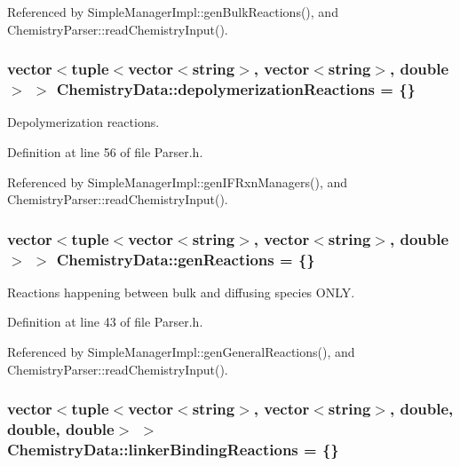 Referenced by Simple\+Manager\+Impl\+::gen\+Bulk\+Reactions(), and Chemistry\+Parser\+::read\+Chemistry\+Input().

\hypertarget{structChemistryData_aac04b01fc7430d924ce82eee1835cbc7}{
\subsubsection[{depolymerization\+Reactions}]{\setlength{\rightskip}{0pt plus 5cm}vector$<$tuple$<$vector$<$string$>$, vector$<$string$>$, double$>$ $>$ Chemistry\+Data\+::depolymerization\+Reactions = \{\}}}\label{structChemistryData_aac04b01fc7430d924ce82eee1835cbc7}


Depolymerization reactions. 



Definition at line 56 of file Parser.\+h.



Referenced by Simple\+Manager\+Impl\+::gen\+I\+F\+Rxn\+Managers(), and Chemistry\+Parser\+::read\+Chemistry\+Input().

\hypertarget{structChemistryData_a4faa68797fd22c5247b9b52a9057023a}{
\subsubsection[{gen\+Reactions}]{\setlength{\rightskip}{0pt plus 5cm}vector$<$tuple$<$vector$<$string$>$, vector$<$string$>$, double$>$ $>$ Chemistry\+Data\+::gen\+Reactions = \{\}}}\label{structChemistryData_a4faa68797fd22c5247b9b52a9057023a}


Reactions happening between bulk and diffusing species O\+N\+L\+Y. 



Definition at line 43 of file Parser.\+h.



Referenced by Simple\+Manager\+Impl\+::gen\+General\+Reactions(), and Chemistry\+Parser\+::read\+Chemistry\+Input().

\hypertarget{structChemistryData_ae3e27a2c950e196017c06f416ee94628}{
\subsubsection[{linker\+Binding\+Reactions}]{\setlength{\rightskip}{0pt plus 5cm}vector$<$tuple$<$vector$<$string$>$, vector$<$string$>$, double, double, double$>$ $>$ Chemistry\+Data\+::linker\+Binding\+Reactions = \{\}}}\label{structChemistryData_ae3e27a2c950e196017c06f416ee94628}


